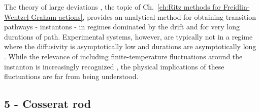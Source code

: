 \documentclass[withindex,glossary,techreport]{cam-thesis}
\begin{document}
The theory of large deviations \citep{ventselSMALLRANDOMPERTURBATIONS1970,stratonovichMarkovMethodsTheory1989,grahamMacroscopicPotentialsBifurcations1989,arnoldStochasticDifferentialEquations1974}, the topic of Ch.~\ref{ch:Ritz methods for Freidlin-Wentzel-Graham actions},
provides an analytical method for obtaining transition pathways -
instantons - in regimes dominated by the drift and for very long durations
of path. Experimental systems, however, are typically not in a regime
where the diffusivity is asymptotically low and durations are asymptotically
long \citep{gladrowExperimentalMeasurementRelative2021}. While the
relevance of including finite-temperature fluctuations around the
instanton \citep{gelfandIntegrationFunctionalSpaces1960} is increasingly
recognized \citep{nickelsenNoiseCorrectionLarge2022, corazzaNormalizedGaussianPath2020b, luGaussianApproximationsTransition2017a},
the physical implications of these fluctuations are far from being
understood.

\subsection{5 - Cosserat rod}








%

\renewcommand{\bibname}{References}
\cleardoublepage
{}
{}












\end{document}
